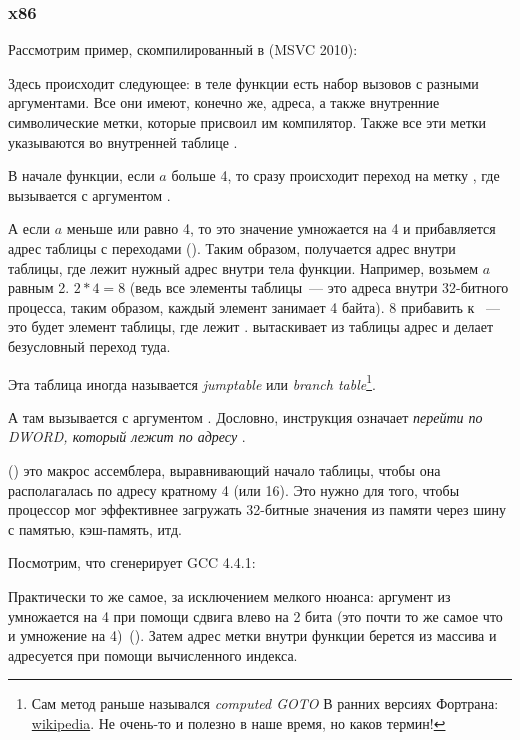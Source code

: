 \subsubsection{x86}


Рассмотрим пример, скомпилированный в (MSVC 2010):



Здесь происходит следующее: в теле функции есть набор вызовов \printf с разными аргументами. 
Все они имеют, конечно же, адреса, а также внутренние символические метки, которые присвоил им компилятор.
Также все эти метки указываются во внутренней таблице .

В начале функции, если $a$ больше 4, то сразу происходит переход на метку , 
где вызывается \printf с аргументом .

А если $a$ меньше или равно 4, то это значение умножается на 4 и прибавляется адрес таблицы 
с переходами (). 
Таким образом, получается адрес внутри таблицы, где лежит нужный адрес внутри тела функции. 
Например, возьмем $a$ равным 2. $2*4 = 8$ (ведь все элементы таблицы~--- это адреса внутри 32-битного процесса, 
таким образом, каждый элемент занимает 4 байта). 8 прибавить к ~--- это будет элемент таблицы,
где лежит . \JMP вытаскивает из таблицы адрес  и делает безусловный переход туда.

Эта таблица иногда называется \emph{jumptable} или
\emph{branch table}\footnote{Сам метод раньше назывался 
\emph{computed GOTO} В ранних версиях Фортрана:
\href{http://go.yurichev.com/17122}{wikipedia}.
Не очень-то и полезно в наше время, но каков термин!}.

А там вызывается \printf с аргументом . 
Дословно, инструкция  
означает \emph{перейти по DWORD, который лежит по адресу} .

 () это макрос ассемблера, выравнивающий начало таблицы, 
чтобы она располагалась по адресу кратному 4 (или 16).
Это нужно для того, чтобы процессор мог эффективнее загружать 32-битные 
значения из памяти через шину с памятью, кэш-память, итд.



\label{switch_lot_GCC}

Посмотрим, что сгенерирует GCC 4.4.1:



Практически то же самое, за исключением мелкого нюанса: аргумент из  умножается на 4 
при помощи сдвига влево на 2 бита (это почти то же самое что и умножение на 4)~().
Затем адрес метки внутри функции берется из массива  и адресуется при помощи 
вычисленного индекса.

